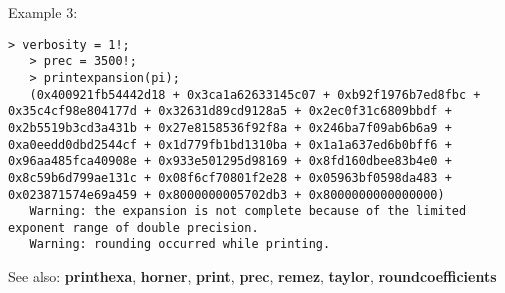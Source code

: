 \noindent Example 3: 
\begin{center}\begin{minipage}{14.8cm}\begin{Verbatim}[frame=single]
   > verbosity = 1!;
   > prec = 3500!;
   > printexpansion(pi);
   (0x400921fb54442d18 + 0x3ca1a62633145c07 + 0xb92f1976b7ed8fbc + 0x35c4cf98e804177d + 0x32631d89cd9128a5 + 0x2ec0f31c6809bbdf + 0x2b5519b3cd3a431b + 0x27e8158536f92f8a + 0x246ba7f09ab6b6a9 + 0xa0eedd0dbd2544cf + 0x1d779fb1bd1310ba + 0x1a1a637ed6b0bff6 + 0x96aa485fca40908e + 0x933e501295d98169 + 0x8fd160dbee83b4e0 + 0x8c59b6d799ae131c + 0x08f6cf70801f2e28 + 0x05963bf0598da483 + 0x023871574e69a459 + 0x8000000005702db3 + 0x8000000000000000)
   Warning: the expansion is not complete because of the limited exponent range of double precision.
   Warning: rounding occurred while printing.
\end{Verbatim}
\end{minipage}\end{center}
See also: \textbf{printhexa}, \textbf{horner}, \textbf{print}, \textbf{prec}, \textbf{remez}, \textbf{taylor}, \textbf{roundcoefficients}
